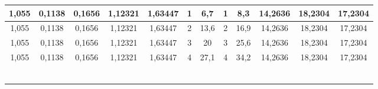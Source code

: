 \begin{tabular}{|*{12}{c|}}
\hline 
1,055 & 0,1138 & 0,1656 & 1,12321 & 1,63447 & 1 & 6,7 & 1 & 8,3 & 14,2636 & 18,2304 & 17,2304 \\ \hline 
 1,055 & 0,1138 & 0,1656 & 1,12321 & 1,63447 & 2 & 13,6 & 2 & 16,9 & 14,2636 & 18,2304 & 17,2304 \\ \hline 
 1,055 & 0,1138 & 0,1656 & 1,12321 & 1,63447 & 3 & 20 & 3 & 25,6 & 14,2636 & 18,2304 & 17,2304 \\ \hline 
 1,055 & 0,1138 & 0,1656 & 1,12321 & 1,63447 & 4 & 27,1 & 4 & 34,2 & 14,2636 & 18,2304 & 17,2304 \\ \hline 
  &  &  &  &  &  &  &  &  &  &  &  \\ \hline 
  &  &  &  &  &  &  &  &  &  &  &  \\ \hline 
  &  &  &  &  &  &  &  &  &  &  &  \\ \hline 
  &  &  &  &  &  &  &  &  &  &  &  \\ \hline 
  &  &  &  &  &  &  &  &  &  &  &  \\ \hline 
  &  &  &  &  &  &  &  &  &  &  &  \\ \hline 
 \end{tabular} 
